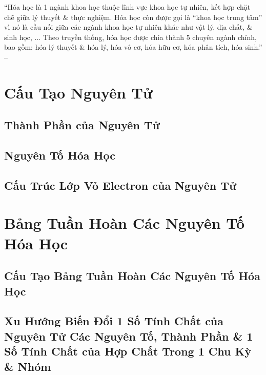 \documentclass[oneside]{book}
\numberwithin{equation}{section}
\begin{document}
``Hóa học là 1 ngành khoa học thuộc lĩnh vực khoa học tự nhiên, kết hợp chặt chẽ giữa lý thuyết \& thực nghiệm. Hóa học còn được gọi là ``khoa học trung tâm'' vì nó là cầu nối giữa các ngành khoa học tự nhiên khác như vật lý, địa chất, \& sinh học, $\ldots$ Theo truyền thống, hóa học được chia thành 5 chuyên ngành chính, bao gồm: hóa lý thuyết \& hóa lý, hóa vô cơ, hóa hữu cơ, hóa phân tích, hóa sinh.'' -- \cite[p. 11]{SGK_Hoa_Hoc_10_Chan_Troi_Sang_Tao}


\chapter{Cấu Tạo Nguyên Tử}

\section{Thành Phần của Nguyên Tử}


\section{Nguyên Tố Hóa Học}


\section{Cấu Trúc Lớp Vỏ Electron của Nguyên Tử}


\chapter{Bảng Tuần Hoàn Các Nguyên Tố Hóa Học}

\section{Cấu Tạo Bảng Tuần Hoàn Các Nguyên Tố Hóa Học}


\section{Xu Hướng Biến Đổi 1 Số Tính Chất của Nguyên Tử Các Nguyên Tố, Thành Phần \& 1 Số Tính Chất của Hợp Chất Trong 1 Chu Kỳ \& Nhóm}
\end{document}
